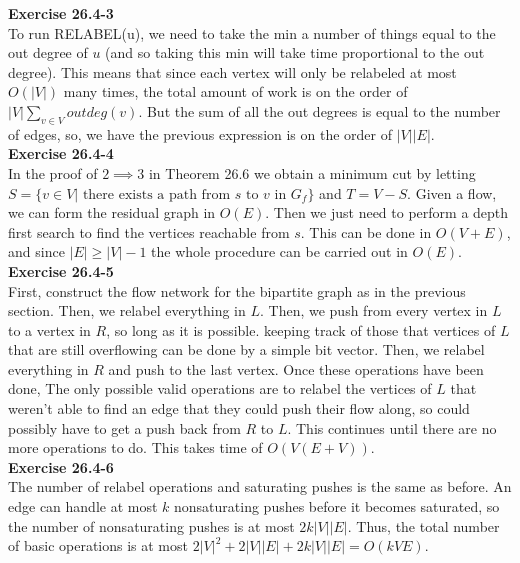 \documentclass{article}
\begin{document}
\noindent\textbf{Exercise 26.4-3}\\

To run RELABEL(u), we need to take the min a number of things equal to the out degree of $u$ (and so taking this min will take time proportional to the out degree). This means that since each vertex will only be relabeled at most $O(|V|)$ many times, the total amount of work is on the order of $|V|\sum_{v\in V} outdeg(v)$. But the sum of all the out degrees is equal to the number of edges, so, we have the previous expression is on the order of $|V||E|$.\\

\noindent\textbf{Exercise 26.4-4}\\

In the proof of $2 \implies 3$ in Theorem 26.6 we obtain a minimum cut by letting $S = \{v \in V | \text{ there exists a path from $s$ to $v$ in $G_f$} \}$ and $T = V - S$.  Given a flow, we can form the residual graph in $O(E)$.  Then we just need to perform a depth first search to find the vertices reachable from $s$.  This can be done in $O(V+E)$, and since $|E| \geq |V| - 1$ the whole procedure can be carried out in $O(E)$. \\

\noindent\textbf{Exercise 26.4-5}\\

First, construct the flow network for the bipartite graph as in the previous section. Then, we relabel everything in $L$. Then, we push from every vertex in $L$ to a vertex in $R$, so long as it is possible. keeping track of those that vertices of $L$ that are still overflowing can be done by a simple bit vector. Then, we relabel everything in $R$ and push to the last vertex. Once these operations have been done, The only possible valid operations are to relabel the vertices of $L$ that weren't able to find an edge that they could push their flow along, so could possibly have to get a push back from $R$ to $L$. This continues until there are no more operations to do. This takes time of $O(V(E+V))$.\\

\noindent\textbf{Exercise 26.4-6}\\

The number of relabel operations and saturating pushes is the same as before.  An edge can handle at most $k$ nonsaturating pushes before it becomes saturated, so the number of nonsaturating pushes is at most $2k|V||E|$. Thus, the total number of basic operations is at most $2|V|^2 + 2|V||E| + 2k|V||E| = O(kVE)$.\\
\end{document}
